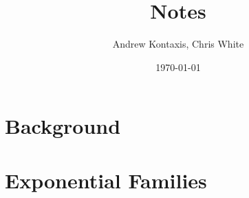 \documentclass[11pt,a4paper]{article}
\title{Notes}
\author{Andrew Kontaxis, Chris White}
\date{\today}
\begin{document}
\maketitle


\section{Background}


\section{Exponential Families}

\end{document}
